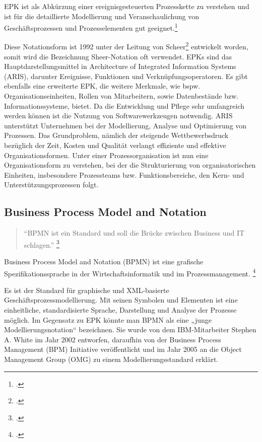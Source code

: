 EPK ist als Abkürzung einer ereignisgesteuerten Prozesskette zu verstehen und
ist für die detaillierte Modellierung und Veranschaulichung
von Geschäftsprozessen und Prozesselementen gut
geeignet.\footcite[Vgl.][]{lehmann}
 

Diese Notationsform ist 1992 unter der Leitung von
Scheer\footcite[Vgl.][]{scheer} entwickelt worden, somit wird die Bezeichnung
Sheer-Notation oft verwendet.
EPKs sind das Hauptdarstellungsmittel in Architecture of Integrated 
Information Systems (ARIS), darunter Ereignisse, 
Funktionen und Verknüpfungsoperatoren. Es gibt ebenfalls eine erweiterte EPK, 
die weitere Merkmale, wie bspw. Organisationseinheiten, Rollen von Mitarbeitern, 
sowie Datenbestände bzw. Informationssysteme, bietet. 
Da die Entwicklung und Pflege sehr umfangreich werden können ist die 
Nutzung von Softwarewerkzeugen notwendig. 
ARIS unterstützt Unternehmen bei der Modellierung, Analyse und Optimierung von Prozessen.
Das Grundproblem, nämlich der steigende Wettbewerbsdruck bezüglich der Zeit, 
Kosten und Qualität verlangt effiziente und effektive Organisationsformen. 
Unter einer Prozessorganisation ist nun eine Organisationsform zu verstehen, 
bei der die Strukturierung von organisatorischen Einheiten, 
insbesondere  Prozessteams bzw. Funktionsbereiche, 
den Kern- und Unterstützungsprozessen folgt.

\subsection{Business Process Model and Notation}

\begin{quote}
"`BPMN ist ein Standard und soll die Brücke zwischen Business und IT schlagen."'
\footcite[Vgl.][]{praxishandbuch:bpmn2}
\end{quote}

Business Process Model and Notation (BPMN) ist eine grafische 
Spezifikationssprache in der Wirtschaftsinformatik und im Prozessmanagement.
\footcite[Vgl.][]{allweyer}

Es ist der Standard für graphische und XML-basierte
Geschäftsprozessmodellierung. 
Mit seinen Symbolen und Elementen ist eine einheitliche, standardisierte Sprache,
Darstellung und Analyse der Prozesse möglich. 
Im Gegensatz zu EPK könnte man BPMN als eine „junge Modellierungsnotation“ bezeichnen. 
Sie wurde von dem IBM-Mitarbeiter Stephen A. White im Jahr 2002 entworfen, 
daraufhin von der Business Process Management (BPM) 
Initiative veröffentlicht und im Jahr 2005 an die Object Management Group (OMG) 
zu einem Modellierungsstandard erklärt.

